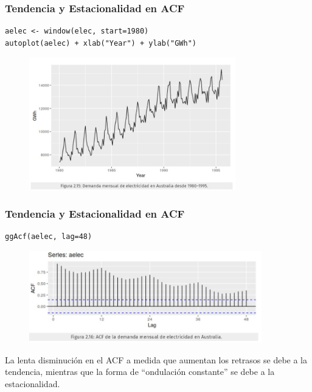 \documentclass[10pt]{beamer}
\begin{document}
\begin{frame}[fragile]
\frametitle{Tendencia y Estacionalidad en ACF}

\lstset{language=r,label= ,caption= ,captionpos=b,numbers=none}
\begin{lstlisting}
aelec <- window(elec, start=1980)
autoplot(aelec) + xlab("Year") + ylab("GWh")
\end{lstlisting}

\pause

\begin{figure}
\begin{center}
    \includegraphics[width=0.8\textwidth]{Imagen30.JPG}
\end{center}
\end{figure}


\end{frame}






\begin{frame}[fragile]
\frametitle{Tendencia y Estacionalidad en ACF}

\lstset{language=r,label= ,caption= ,captionpos=b,numbers=none}
\begin{lstlisting}
ggAcf(aelec, lag=48)
\end{lstlisting}

\pause

\begin{figure}
\begin{center}
    \includegraphics[width=0.9\textwidth]{Imagen31.JPG}
\end{center}
\end{figure}

\pause
La lenta disminución en el ACF a medida que aumentan los retrasos se debe a la tendencia, mientras que la forma de ``ondulación constante'' se debe a la estacionalidad.

\end{frame}
\end{document}

